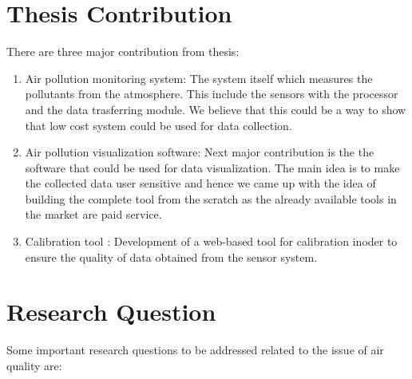 \section{Thesis Contribution}

There are three major contribution from thesis:
\begin{enumerate}
  
    \item Air pollution monitoring system: The system itself which measures the pollutants from the atmosphere. This include the sensors with the processor and the data trasferring module. We believe that this could be a way to show that low cost system could be used for data collection.
    
    \item  Air pollution visualization software: Next major contribution is the the software that could be used for data visualization. The main idea is to make the collected data user sensitive and hence we came up with the idea of building the complete tool from the scratch as the already available tools in the market are paid service. 
    
    \item Calibration tool : Development of a web-based tool for calibration inoder to ensure the quality of data obtained from the sensor system.
    
  
\end{enumerate}


\section{Research Question}
 
 Some important research questions to be addressed related to the issue of air quality are: 

